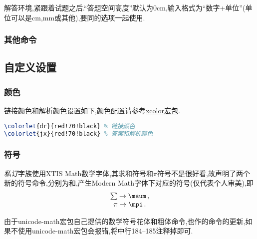 \documentclass[list,answers,csize4,custom]{sysuexam}
\begin{document}
解答环境,紧跟着试题之后.``答题空间高度''默认为0cm,输入格式为``数字+单位''(单位可以是cm,mm或其他),要同的选项一起使用.


\subsubsection{其他命令}

\subsection{自定义设置}
\subsubsection{颜色}
链接颜色和解析颜色设置如下,颜色配置请参考\href{https://mirror-hk.koddos.net/CTAN/macros/latex/contrib/xcolor/xcolor.pdf}{xcolor宏包}.
\begin{lstlisting}[title=颜色设置,language=tex,firstnumber=92]
\colorlet{dr}{red!70!black}	% 链接颜色
\colorlet{jx}{red!70!black}	% 答案和解析颜色
\end{lstlisting}

\subsubsection{符号}
\textit{私订}字族使用XTIS Math数学字体,其求和符号和$\pi$符号不是很好看,故声明了两个新的符号命令,分别为和,产生Modern Math字体下对应的符号(仅代表个人审美),即
$$
\begin{array}{c}
\sum \rightarrow \msum \,,\\
\pi  \rightarrow \mpi  \,.
\end{array}
$$

由于unicode-math宏包自己提供的数学符号花体和粗体命令,也作的命令的更新,如果不使用unicode-math宏包会报错,将中行184--185注释掉即可.
\end{document}
